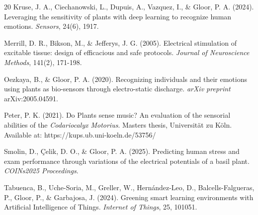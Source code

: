 \documentclass{article}
\begin{document}
\begin{thebibliography}{20}
Kruse, J. A., Ciechanowski, L., Dupuis, A., Vazquez, I., \& Gloor, P. A. (2024). Leveraging the sensitivity of plants with deep learning to recognize human emotions. \textit{Sensors}, 24(6), 1917.

Merrill, D. R., Bikson, M., \& Jefferys, J. G. (2005). Electrical stimulation of excitable tissue: design of efficacious and safe protocols. \textit{Journal of Neuroscience Methods}, 141(2), 171-198.

Oezkaya, B., \& Gloor, P. A. (2020). Recognizing individuals and their emotions using plants as bio-sensors through electro-static discharge. \textit{arXiv preprint} arXiv:2005.04591.

Peter, P. K. (2021). Do Plants sense music? An evaluation of the sensorial abilities of the \textit{Codariocalyx Motorius}. Masters thesis, Universität zu Köln. Available at: https://kups.ub.uni-koeln.de/53756/

Smolin, D., Çelik, D. O., \& Gloor, P. A. (2025). Predicting human stress and exam performance through variations of the electrical potentials of a basil plant. \textit{COINs2025 Proceedings}.

Tabuenca, B., Uche-Soria, M., Greller, W., Hernández-Leo, D., Balcells-Falgueras, P., Gloor, P., \& Garbajosa, J. (2024). Greening smart learning environments with Artificial Intelligence of Things. \textit{Internet of Things}, 25, 101051.

\end{thebibliography}
\end{document}
